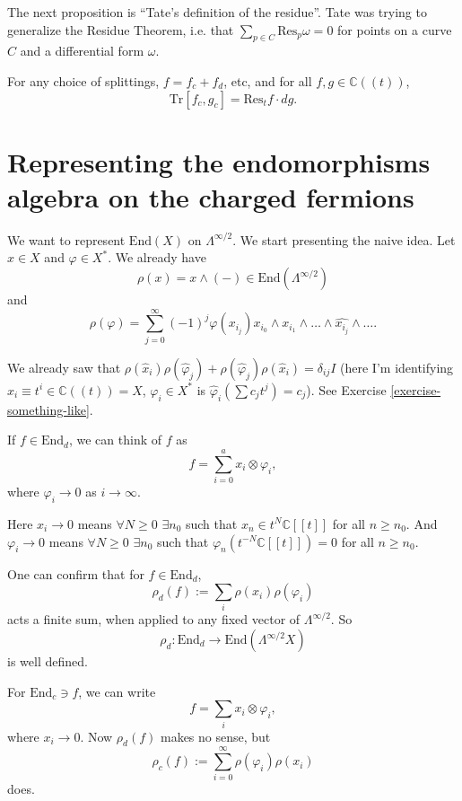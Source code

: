 \noindent
The next proposition is
``Tate's definition of the residue''.
Tate was trying to generalize the Residue
Theorem,
i.e. that $\sum_{p \in C}\text{Res}_p
\omega=0$
for points on a curve $C$ and a differential
form $\omega$.

\begin{proposition}
\label{proposition-trace}
For any choice of splittings,
$f=f_c+f_d$, etc, and for all $f,g \in
\mathbb{C}((t))$,
$$
\text{Tr}[f_c,g_c]=\text{Res}_tf\cdot dg.
$$
\end{proposition}

\section{Representing the endomorphisms
algebra on the charged fermions}
\label{section-end-rep-fermions}

We want to represent $\text{End}(X)$ on $
\Lambda^{\infty/2}$.
We start presenting the naive idea.
Let $x \in X$ and $\varphi \in X^*$.
We already have
$$
\rho(x)=x \wedge(-) \in
\text{End}(\Lambda^{\infty/2})
$$
and
$$
\rho(\varphi)=\sum_{j=0}^\infty(-1)^j
\varphi(x_{i_j})x_{i_0}\wedge
x_{i_1}\wedge\ldots\wedge \widehat{x_{i_j}}
\wedge \ldots.
$$

\noindent
We already saw that
$\rho(\hat{x}_i)\rho(\hat{\varphi}_j)+
\rho(\hat{\varphi}_j)\rho(\hat{x}_i)
=\delta_{ij}I$
(here I'm identifying
$\hat{x}_i \equiv t^i \in \mathbb{C}((t))=X$,
 $\varphi_i \in X^*$ is
$\hat{\varphi}_i (\sum c_jt^j)=c_j$).
See Exercise \ref{exercise-something-like}.

If $f \in \text{End}_d$, we can think of $f$
as
$$
f=\sum_{i=0}^a x_i \otimes \varphi_i,
$$
where $\varphi_i\to 0$ as $i \to \infty$.

Here $x_i \to 0$ means
$\forall  N \geq 0$ $\exists n_0$ such that
$x_n \in t^N \mathbb{C}[[t]]$ for all $n\geq
n_0$.
And $\varphi_i \to 0$ means $\forall  N \geq
0$ $\exists n_0$
such that
$\varphi_n(t^{-N}\mathbb{C}[[t]])=0$ for all
$n\geq n_0$.

One can confirm that for $f \in
\text{End}_d$,
$$
\rho_d(f):=\sum_i\rho(x_i)\rho(\varphi_i)
$$
acts a finite sum,
when applied to any fixed vector of
$\Lambda^{\infty/2}$.
So
$$
\rho_d:\text{End}_d \to
\text{End}(\Lambda^{\infty/2}X)
$$
is well defined.

For  $\text{End}_c \ni f$, we can write
$$
f=\sum_i x_i \otimes \varphi_i,
$$
where $x_i \to 0$.
Now $\rho_d(f)$ makes no sense, but
$$
\rho_c(f):=\sum_{i=0}^\infty\rho(\varphi_i)
\rho(x_i)
$$
does.

